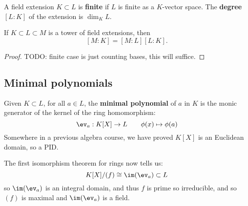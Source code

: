 \documentclass{article}
\begin{document}
\begin{definition}
    A field extension $K\subset L$ is \textbf{finite} if $L$ is finite as a $K$-vector space. The \textbf{degree} $[L:K]$ of the extension is $\dim_KL$.
\end{definition}

\begin{proposition}
    If $K\subset L \subset M$ is a tower of field extensions, then \[[M:K]=[M:L][L:K].\]\begin{proof}
        TODO: finite case is just counting bases, this will suffice.
    \end{proof}
\end{proposition}

\subsection{Minimal polynomials}

\begin{definition}
    Given $K\subset L$, for all $a\in L$, the \textbf{minimal polynomial} of $a$ in $K$ is the monic generator of the kernel of the ring homomorphism: \[
        \ev_a : K[X] \rightarrow L \qquad \phi(x) \mapsto \phi(a)
    \] Somewhere in a previous algebra course, we have proved $K[X]$ is an Euclidean domain, so a PID.
\end{definition}

The first isomorphism theorem for rings now tells us: \[
    K[X] / (f) \cong \im(\ev_a) \subset L
\] so $\im(\ev_a)$ is an integral domain, and thus $f$ is prime so irreducible, and so $(f)$ is maximal and $\im(\ev_a)$ is a field.
\end{document}
